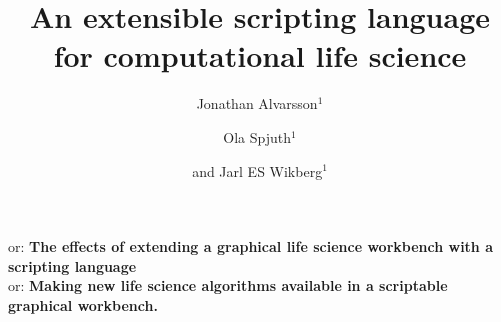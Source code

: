 \documentclass[10pt]{bmc_article}
\newenvironment{bmcformat}{\begin{raggedright}\baselineskip20pt\sloppy\setboolean{publ}{false}}{\end{raggedright}\baselineskip20pt\sloppy}
\begin{document}
\begin{bmcformat}



\title{An extensible scripting language for computational life science}
 


\author{
    Jonathan Alvarsson\correspondingauthor$^{1}$%
    \and
    Ola Spjuth$^1$%
    \and
    and
    Jarl ES Wikberg$^1$%
}
      


\address{%
    \iid(1)Department of Pharmaceutical Biosciences, Uppsala University,
    Uppsala, Sweden 
}%

\maketitle

or: \Large \textbf{\textsf{The effects of extending a graphical life science workbench with a
scripting language}} \\ 
\normalsize
or: \Large \textbf{\textsf{Making new life science algorithms available in a
scriptable graphical workbench.}} \\
\normalsize




\end{bmcformat}
\end{document}
